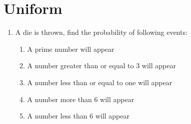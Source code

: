     \section{Uniform}
\begin{enumerate}[label=\thesection.\arabic*,ref=\thesection.\theenumi]
\item A die is thrown, find the probability of following events:
\begin{enumerate}
\item A prime number will appear
\item A number greater than or equal to 3 will appear
\item A number less than or equal to one will appear
\item A number more than 6 will appear
\item A number less than 6 will appear
\end{enumerate}
\solution

    \end{enumerate}
